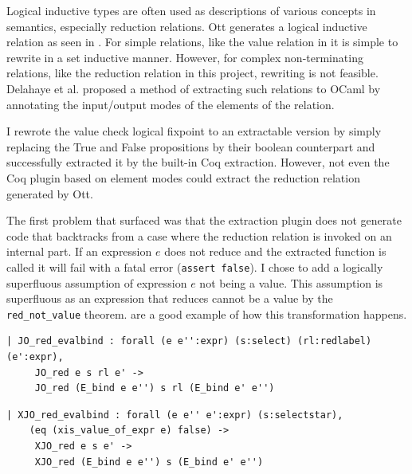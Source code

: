 \documentclass[12pt,twoside,notitlepage]{report}
\theoremstyle{plain}%
\theoremstyle{definition}
\theoremstyle{remark}
\begin{document}
Logical inductive types are often used as descriptions of various concepts in semantics, especially reduction relations. Ott generates a logical inductive relation as seen in . For simple relations, like the value relation in  it is simple to rewrite in a set inductive manner. However, for complex non-terminating relations, like the reduction relation in this project, rewriting is not feasible.  Delahaye et al.\cite{delahaye2007extracting,tollitte2012producing} proposed a method of extracting such relations to OCaml by annotating the input/output modes of the elements of the relation. \label{sec:extractable_plugin_descr}

I rewrote the value check logical fixpoint to an extractable version by simply replacing the True and False propositions by their boolean counterpart and successfully extracted it by the built-in Coq extraction. However, not even the Coq plugin based on element modes could extract the reduction relation generated by Ott. 

The first problem that surfaced was that the extraction plugin does not generate code that backtracks from a case where the reduction relation is invoked on an internal part. If an expression $ e $ does not reduce and the extracted function is called it will fail with a fatal error (\lstinline|assert false|). I chose to add a logically superfluous assumption of expression $ e $ not being a value. This assumption is superfluous as an expression that reduces cannot be a value by the \verb|red_not_value| theorem.   are a good example of how this transformation happens. \vspace{4mm}

\begin{minipage}{0.9\linewidth}

\begin{lstlisting}[language={Coq},caption={Coq reduction clause with unsafe assumption}, label={lst:coqredunsafe}]
| JO_red_evalbind : forall (e e'':expr) (s:select) (rl:redlabel) (e':expr),
     JO_red e s rl e' ->
     JO_red (E_bind e e'') s rl (E_bind e' e'')
\end{lstlisting}

\end{minipage}

\begin{minipage}{\linewidth}

\begin{lstlisting}[language={Coq},caption={Coq extractable reduction clause with safe assumption}, label={lst:coqxredsafe}]
 | XJO_red_evalbind : forall (e e'' e':expr) (s:selectstar),
    (eq (xis_value_of_expr e) false) ->
     XJO_red e s e' ->
     XJO_red (E_bind e e'') s (E_bind e' e'')
\end{lstlisting}

\end{minipage}
\end{document}
